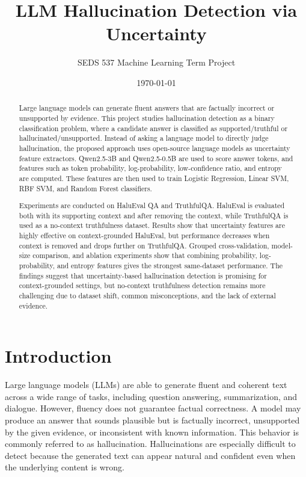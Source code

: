 \documentclass[11pt]{article}
\title{LLM Hallucination Detection via Uncertainty}
\author{SEDS 537 Machine Learning Term Project}
\date{\today}
\begin{document}
\maketitle

\begin{abstract}
Large language models can generate fluent answers that are factually incorrect or unsupported by evidence. This project studies hallucination detection as a binary classification problem, where a candidate answer is classified as supported/truthful or hallucinated/unsupported. Instead of asking a language model to directly judge hallucination, the proposed approach uses open-source language models as uncertainty feature extractors. Qwen2.5-3B and Qwen2.5-0.5B are used to score answer tokens, and features such as token probability, log-probability, low-confidence ratio, and entropy are computed. These features are then used to train Logistic Regression, Linear SVM, RBF SVM, and Random Forest classifiers.

Experiments are conducted on HaluEval QA and TruthfulQA. HaluEval is evaluated both with its supporting context and after removing the context, while TruthfulQA is used as a no-context truthfulness dataset. Results show that uncertainty features are highly effective on context-grounded HaluEval, but performance decreases when context is removed and drops further on TruthfulQA. Grouped cross-validation, model-size comparison, and ablation experiments show that combining probability, log-probability, and entropy features gives the strongest same-dataset performance. The findings suggest that uncertainty-based hallucination detection is promising for context-grounded settings, but no-context truthfulness detection remains more challenging due to dataset shift, common misconceptions, and the lack of external evidence.
\end{abstract}

\newpage

\section{Introduction}
Large language models (LLMs) are able to generate fluent and coherent text across a wide range of tasks, including question answering, summarization, and dialogue. However, fluency does not guarantee factual correctness. A model may produce an answer that sounds plausible but is factually incorrect, unsupported by the given evidence, or inconsistent with known information. This behavior is commonly referred to as hallucination. Hallucinations are especially difficult to detect because the generated text can appear natural and confident even when the underlying content is wrong.
\end{document}
